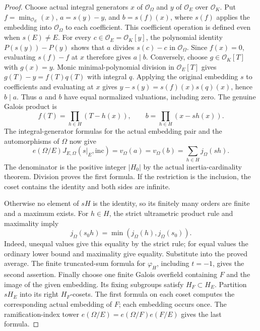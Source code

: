 \begin{proof}
Choose actual integral generators $x$ of $\mathcal O_\Omega$ and
$y$ of $\mathcal O_E$ over $\mathcal O_K$. Put
$f=\min_{\mathcal O_E}(x)$, $a=s(y)-y$, and
$b=s(f)(x)$, where $s(f)$ applies the embedding into
$\mathcal O_\Omega$ to each coefficient. This coefficient operation
is defined even when $s(E)\ne E$.
For every $c\in\mathcal O_E=\mathcal O_K[y]$, the polynomial identity
$P(s(y))-P(y)$ shows that $a$ divides $s(c)-c$ in
$\mathcal O_\Omega$. Since $f(x)=0$, evaluating $s(f)-f$ at $x$
therefore gives $a\mid b$.
Conversely, choose $g\in\mathcal O_K[T]$ with $g(x)=y$.
Monic minimal-polynomial division in $\mathcal O_E[T]$ gives
$g(T)-y=f(T)q(T)$ with integral $q$. Applying the original embedding
$s$ to coefficients and evaluating at $x$ gives
$y-s(y)=s(f)(x)s(q)(x)$, hence $b\mid a$.
Thus $a$ and $b$ have equal normalized valuations, including zero.
The genuine Galois product is
\[
 f(T)=\prod_{h\in H}(T-h(x)),\qquad
 b=\prod_{h\in H}(x-sh(x)).
\]
The integral-generator formulas for the actual embedding pair and
the automorphisms of $\Omega$ now give
\[
 e(\Omega/E)J_{E,\Omega}(s|_E,\mathrm{inc})
 =v_\Omega(a)=v_\Omega(b)=\sum_{h\in H}j_\Omega(sh).
\]
The denominator is the positive integer $|H_0|$ by the actual
inertia-cardinality theorem. Division proves the first formula.
If the restriction is the inclusion, the coset contains the identity
and both sides are infinite.

Otherwise no element of $sH$ is the identity, so its finitely many
orders are finite and a maximum exists. For $h\in H$, the strict
ultrametric product rule and maximality imply
\[
 j_\Omega(s_0h)=\min(j_\Omega(h),j_\Omega(s_0)).
\]
Indeed, unequal values give this equality by the strict rule; for
equal values the ordinary lower bound and maximality give equality.
Substitute into the proved average. The finite truncated-sum formula
for $\varphi_H$, including $t=-1$, gives the second assertion.
Finally choose one finite Galois overfield containing $F$ and the
image of the given embedding. Its fixing subgroups satisfy
$H_F\subset H_E$. Partition $sH_E$ into its right $H_F$-cosets.
The first formula on each coset computes the corresponding actual
embedding of $F$; each embedding occurs once. The ramification-index
tower $e(\Omega/E)=e(\Omega/F)e(F/E)$ gives the last formula.
\end{proof}

